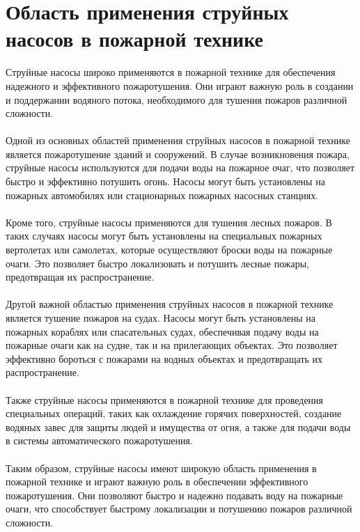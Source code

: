 \documentclass{article}
\begin{document}
\section{Область применения струйных насосов в пожарной технике}
Струйные насосы широко применяются в пожарной технике для обеспечения надежного и эффективного пожаротушения. Они играют важную роль в создании и поддержании водяного потока, необходимого для тушения пожаров различной сложности.\\
~\\
Одной из основных областей применения струйных насосов в пожарной технике является пожаротушение зданий и сооружений. В случае возникновения пожара, струйные насосы используются для подачи воды на пожарное очаг, что позволяет быстро и эффективно потушить огонь. Насосы могут быть установлены на пожарных автомобилях или стационарных пожарных насосных станциях.\\
~\\
Кроме того, струйные насосы применяются для тушения лесных пожаров. В таких случаях насосы могут быть установлены на специальных пожарных вертолетах или самолетах, которые осуществляют броски воды на пожарные очаги. Это позволяет быстро локализовать и потушить лесные пожары, предотвращая их распространение.\\
~\\
Другой важной областью применения струйных насосов в пожарной технике является тушение пожаров на судах. Насосы могут быть установлены на пожарных кораблях или спасательных судах, обеспечивая подачу воды на пожарные очаги как на судне, так и на прилегающих объектах. Это позволяет эффективно бороться с пожарами на водных объектах и предотвращать их распространение.\\
~\\
Также струйные насосы применяются в пожарной технике для проведения специальных операций, таких как охлаждение горячих поверхностей, создание водяных завес для защиты людей и имущества от огня, а также для подачи воды в системы автоматического пожаротушения.\\
~\\
Таким образом, струйные насосы имеют широкую область применения в пожарной технике и играют важную роль в обеспечении эффективного пожаротушения. Они позволяют быстро и надежно подавать воду на пожарные очаги, что способствует быстрому локализации и потушению пожаров различной сложности.
\end{document}

